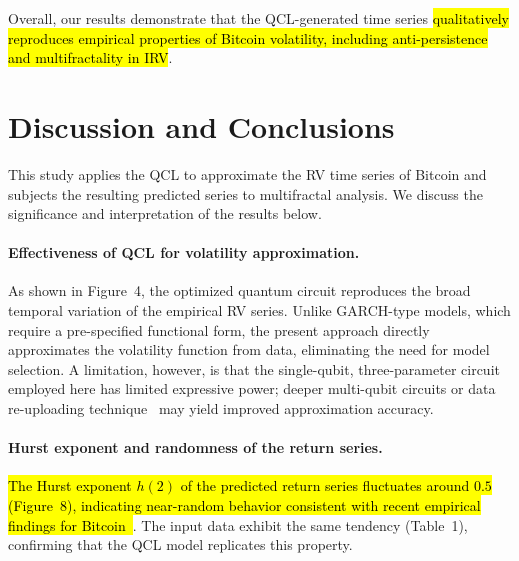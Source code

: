 \documentclass[preprints,article,accept,pdftex,oneauthor]{Definitions/mdpi}
\begin{document}

Overall, our results demonstrate that the QCL-generated time series \hl{qualitatively reproduces empirical properties of Bitcoin volatility, including anti-persistence and multifractality in IRV}.


\section{Discussion and Conclusions}
 
This study applies the QCL to approximate
the RV time series of Bitcoin and subjects the
resulting predicted series to multifractal analysis. We discuss the
significance and interpretation of the results below.
 
\paragraph{Effectiveness of QCL for volatility approximation.}
As shown in Figure~4, the optimized quantum circuit reproduces the
broad temporal variation of the empirical RV series. Unlike GARCH-type
models, which require a pre-specified functional form, the present
approach directly approximates the volatility function from data,
eliminating the need for model selection. A limitation, however, is
that the single-qubit, three-parameter circuit employed here has
limited expressive power; deeper multi-qubit circuits or data re-uploading technique~\cite{perez2020data,perez2021one} may yield
improved approximation accuracy.
 
\paragraph{Hurst exponent and randomness of the return series.}
\hl{The Hurst exponent $h(2)$ of the predicted return series fluctuates
around $0.5$ (Figure~8), indicating near-random behavior consistent
with recent empirical findings
for Bitcoin~\mbox{\cite{takaishi2018,takaishi2019market,takaishi2021time}}}. The input data exhibit the same tendency (Table~1),
confirming that the QCL model replicates this
property.
 
\end{document}
